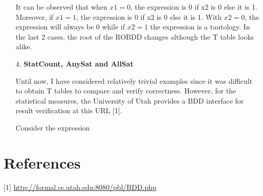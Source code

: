 \documentclass[a4paper, titlepage, 12pt]{article}
\numberwithin{equation}{section}
\begin{document}
\begin{itemize}
                    It can be observed that when $x1 = 0$, the expression is 0 if x2 is 0 else it is 1.
                    Moreover, if $x1 = 1$, the expression is 0 if x2 is 0 else it is 1.
                    With $x2 = 0$, the expression will always be 0 while if $x2 = 1$ the expression is a tautology.
                    In the last 2 cases, the root of the ROBDD changes although the T table looks alike.

                \item[4.] \textbf{StatCount, AnySat and AllSat}
                
                    Until now, I have considered relatively trivial examples since it was difficult to obtain T tables to compare and verify correctness.
                    However, for the statistical measures, the University of Utah provides a BDD interface for result verification at this URL [1].

                    Consider the expression 

            \end{itemize}
    
    \section{References}

            [1]  \href{http://formal.cs.utah.edu:8080/pbl/BDD.php}{http://formal.cs.utah.edu:8080/pbl/BDD.php}
\end{document}
